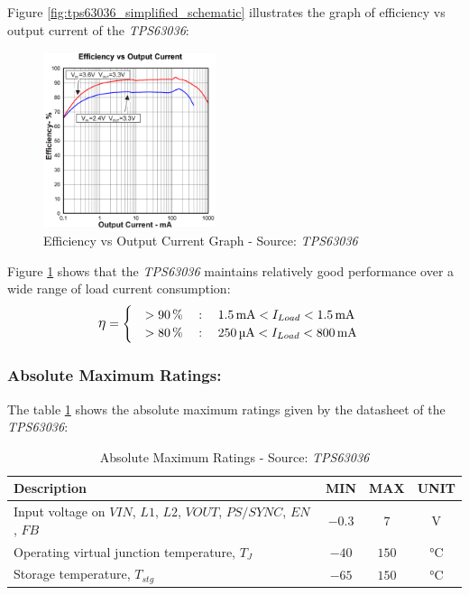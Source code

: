 \documentclass[report.tex]{subfiles}
\begin{document}
Figure \ref{fig:tps63036_simplified_schematic} illustrates the graph of efficiency vs output current of the \textit{TPS63036}:

\begin{figure}[H]
	\centering
	\includegraphics[width=0.45\textwidth]{Include/Figure/comp/tps63036_efficiency_output_current.png}
	\caption{Efficiency vs Output Current Graph - Source: \textit{TPS63036}\cite{TPS63036}}
	\label{fig:tps63036_efficiency_output_current}
\end{figure}

Figure \ref{fig:tps63036_efficiency_output_current} shows that the \textit{TPS63036}\cite{TPS63036} maintains relatively good performance over a wide range of load current consumption:
$$
\mathlarger{\eta} =
\begin{cases} 
\quad >\SI{90}{\percent} \quad : \quad \SI{1.5}{\milli\ampere} < I_{Load} < \SI{1.5}{\milli\ampere} \\
\quad >\SI{80}{\percent} \quad : \quad \SI{250}{\micro\ampere} < I_{Load} < \SI{800}{\milli\ampere}
\end{cases}
$$


\subsubsection{Absolute Maximum Ratings:}

The table \ref{tab:tps63036_abs_max} shows the absolute maximum ratings given by the datasheet of the \textit{TPS63036}\cite{TPS63036}:

\begin{table}[H]
\centering
\begin{tabularx}{\textwidth}{|X|c|c|c|}\hline
\textbf{Description} & \textbf{MIN} & \textbf{MAX} & \textbf{UNIT} \\\hline
Input voltage on $VIN$, $L1$, $L2$, $VOUT$, $PS/SYNC$, $EN$, $FB$ & $-0.3$ & $7$ & $\si{\volt}$ \\\hline
Operating virtual junction temperature, $T_J$ & $-40$ & $150$ & $\si{\celsius}$ \\\hline 
Storage temperature, $T_{stg}$ & $-65$ & $150$ & $\si{\celsius}$ \\\hline 
 
\end{tabularx}
\caption{Absolute Maximum Ratings - Source: \textit{TPS63036}\cite{TPS63036}}
\label{tab:tps63036_abs_max}
\end{table}
\end{document}
